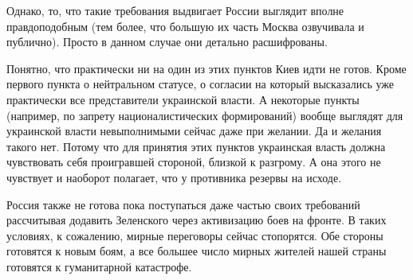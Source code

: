 Однако, то, что такие требования выдвигает России выглядит вполне
правдоподобным (тем более, что большую их часть Москва озвучивала и публично).
Просто в данном случае они детально расшифрованы.

Понятно, что практически ни на один из этих пунктов Киев идти не готов. Кроме
первого пункта о нейтральном статусе, о согласии на который высказались уже
практически все представители украинской власти. А некоторые пункты (например,
по запрету националистических формирований) вообще выглядят для украинской
власти невыполнимыми сейчас даже при желании. Да и желания такого нет. Потому
что для принятия этих пунктов украинская власть должна чувствовать себя
проигравшей стороной, близкой к разгрому. А она этого не чувствует и наоборот
полагает, что у противника резервы на исходе.

Россия также не готова пока поступаться даже частью своих требований
рассчитывая додавить Зеленского через активизацию боев на фронте. В таких
условиях, к сожалению, мирные переговоры сейчас стопорятся. Обе стороны
готовятся к новым боям, а все большее число мирных жителей нашей страны
готовятся к гуманитарной катастрофе.


